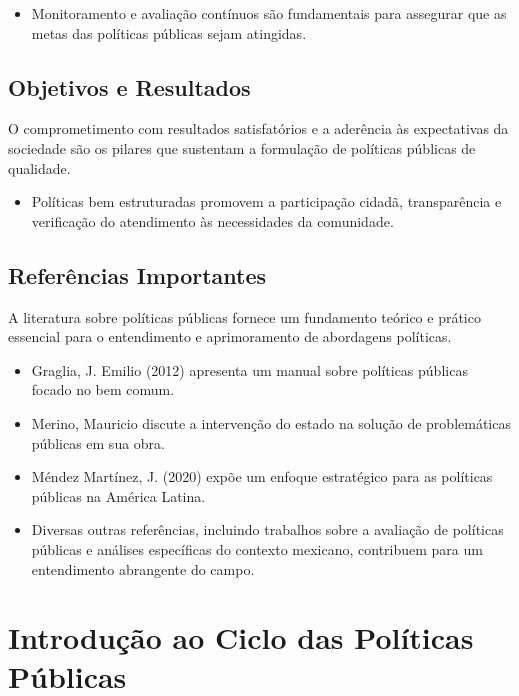 \documentclass[
   article,       
   12pt,          
   oneside,       
   a4paper,       
   english,       
   brazil,        
   sumario=tradicional
   ]{abntex2}
\begin{document}
\begin{itemize}
    \item Monitoramento e avaliação contínuos são fundamentais para assegurar que as metas das políticas públicas sejam atingidas.
\end{itemize}

\subsection{Objetivos e Resultados}

O comprometimento com resultados satisfatórios e a aderência às expectativas da sociedade são os pilares que sustentam a formulação de políticas públicas de qualidade.

\begin{itemize}
    \item Políticas bem estruturadas promovem a participação cidadã, transparência e verificação do atendimento às necessidades da comunidade.
\end{itemize}

\subsection{Referências Importantes}

A literatura sobre políticas públicas fornece um fundamento teórico e prático essencial para o entendimento e aprimoramento de abordagens políticas.

\begin{itemize}
    \item Graglia, J. Emilio (2012) apresenta um manual sobre políticas públicas focado no bem comum.
    \item Merino, Mauricio discute a intervenção do estado na solução de problemáticas públicas em sua obra.
    \item Méndez Martínez, J. (2020) expõe um enfoque estratégico para as políticas públicas na América Latina.
    \item Diversas outras referências, incluindo trabalhos sobre a avaliação de políticas públicas e análises específicas do contexto mexicano, contribuem para um entendimento abrangente do campo.
\end{itemize}
\section{Introdução ao Ciclo das Políticas Públicas}
\end{document}
